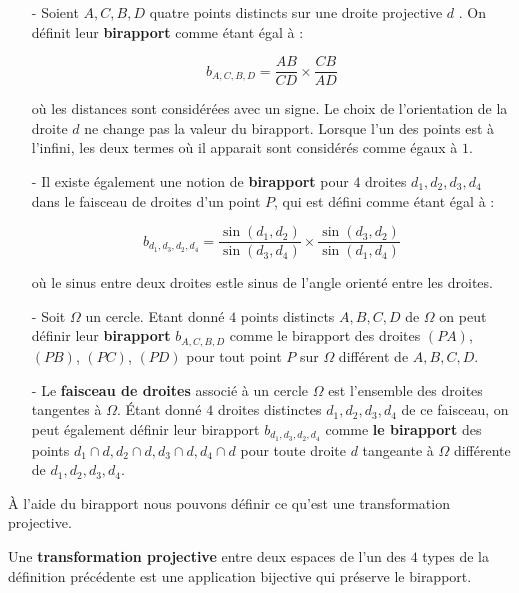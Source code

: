 \begin{dfn}

\begin{itemize}

\item[-]Soient $A,C,B,D$ quatre points distincts sur une droite projective $d$
. On définit leur \textbf{birapport} comme étant égal à :

$$b_{A,C,B,D}=\frac{AB}{CD}\times\frac{CB}{AD}$$

où les distances sont considérées avec un signe. Le choix de l'orientation de la droite $d$ ne change pas la valeur du birapport. Lorsque l'un des points est à l'infini, les deux termes où il apparait sont considérés comme égaux à $1$.

\item[-] Il existe également une notion de \textbf{birapport} pour $4$ droites $d_1,d_2,d_3,d_4$ dans le faisceau de droites d'un point $P$, qui est défini comme étant égal à :

$$b_{d_1,d_3,d_2,d_4}=\frac{\sin(d_1,d_2)}{\sin(d_3,d_4)}\times\frac{\sin(d_3,d_2)}{\sin(d_1,d_4)}$$

où le sinus entre deux droites estle sinus de l'angle orienté entre les droites.

\item[-] Soit $\Omega$ un cercle. Etant donné $4$ points distincts $A,B,C,D$ de $\Omega$ on peut définir leur \textbf{birapport} $b_{A,C,B,D}$ comme le birapport des droites $(PA)$, $(PB)$, $(PC)$, $(PD)$ pour tout point $P$ sur $\Omega$ différent de $A,B,C,D$.

\medskip

\item[-]Le \textbf{faisceau de droites} associé à un cercle $\Omega$ est l'ensemble des droites tangentes à $\Omega$. \'Etant donné $4$ droites distinctes $d_1,d_2,d_3,d_4$ de ce faisceau, on peut également définir leur birapport $b_{d_1,d_3,d_2,d_4}$ comme \textbf{le birapport} des points $d_1\cap d,d_2\cap d,d_3\cap d,d_4\cap d$ pour toute droite $d$ tangeante à $\Omega$ différente de $d_1,d_2,d_3,d_4$.

\end{itemize}
\end{dfn}

À l'aide du birapport nous pouvons définir ce qu'est une transformation projective.


\begin{dfn}
Une \textbf{transformation projective} entre deux espaces de l'un des $4$ types de la définition précédente est une application bijective qui préserve le birapport.
\end{dfn}


